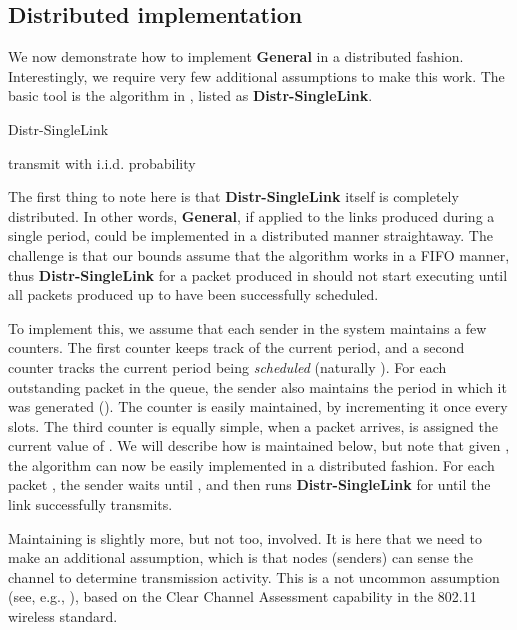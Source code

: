 \documentclass[11pt]{amsart}
\newcommand{\alg}[1]{\textbf{#1}}
\begin{document}
\subsection{Distributed implementation}
\label{sec:distr}


We now demonstrate how to implement \alg{General} in a distributed fashion.
Interestingly, we require very few additional assumptions to make this work. 
The basic tool is the 
algorithm in \cite{KV10}, listed as \alg{Distr-SingleLink}. 

\begin{algorithm}                      \caption{Distr-SingleLink}          \label{alg3}                           \begin{algorithmic}[1]                    \STATE 
       \STATE 
          \STATE transmit with i.i.d. probability 
       \ENDFOR
       \STATE 
     \ENDWHILE
\end{algorithmic}
\label{alg13ig}
\end{algorithm}

The first thing to note here is that \alg{Distr-SingleLink} itself is completely distributed. 
In other words, \alg{General}, if applied to the links
produced during a single period, could be implemented in a distributed manner straightaway. 
The challenge is that our bounds assume that the algorithm works in a FIFO
manner, thus \alg{Distr-SingleLink} for a packet produced in  should not start
executing until all packets produced up to  have been successfully scheduled. 

To implement this, we assume that each sender in the system maintains a few counters. 
The first counter  keeps track of the current period, and a second counter  tracks the current
period being \emph{scheduled} (naturally ). 
For each outstanding packet  in the queue, the sender also maintains the period
in which it was generated (). 
The counter  is easily maintained, by incrementing it once every  slots. 
The third counter is equally simple, when a packet  arrives,  is assigned
the current value of . We will describe how  is maintained below, but note that
given , the algorithm can now be easily implemented in a distributed fashion. For each
packet , the sender waits until , and then runs \alg{Distr-SingleLink} for  until
the link successfully transmits.

Maintaining  is slightly more, but not too, involved. 
It is here that we need to make an additional assumption, which is that nodes (senders) can
sense the channel to determine transmission activity. 
This is a not uncommon assumption (see, e.g., \cite{ScheidelerRS08}), based on the Clear Channel Assessment capability in the 802.11 wireless standard.
\end{document}
